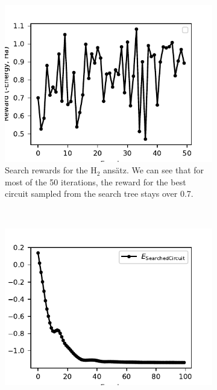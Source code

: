 \documentclass[a4paper,onecolumn,11pt]{quantumarticle}
\begin{document}
\begin{figure}[H]
    \centering
    \begin{subfigure}[t]{0.48\linewidth}
        \includegraphics[width=\linewidth]{Figures/fig_h2_vac_init_search_rewards.pdf}
        \caption{Search rewards for the $\text{H}_2$ ans\"atz. We can see that for most of the 50 iterations, the reward for the best circuit sampled from the search tree stays over 0.7.}
        \label{fig:h2_search}
    \end{subfigure}
    ~ %
    \begin{subfigure}[t]{0.48\linewidth}
        \includegraphics[width=\linewidth]{Figures/fig_h2_vac_init_fine_tune_loss.pdf}

\end{subfigure}
\end{figure}
\end{document}
